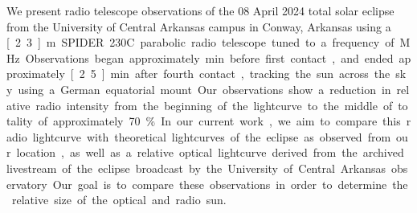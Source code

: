 We present radio telescope observations of the 08 April 2024 total solar eclipse from the University of Central Arkansas campus in Conway, Arkansas using a \unit[2.3]{m} SPIDER 230C parabolic radio telescope tuned to a frequency of \unit[1420]{MHz}.
Observations began approximately \unit[19]{min} before first contact, and ended approximately \unit[2.5]{min} after fourth contact, tracking the sun across the sky using a German equatorial mount.
Our observations show a reduction in relative radio intensity from the beginning of the lightcurve to the middle of totality of approximately 70\%.
In our current work, we aim to compare this radio lightcurve with theoretical lightcurves of the eclipse as observed from our location, as well as a relative optical lightcurve derived from the archived livestream of the eclipse broadcast by the University of Central Arkansas observatory.
Our goal is to compare these observations in order to determine the relative size of the optical and radio sun.
